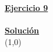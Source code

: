\indent\underline{\textbf{Ejercicio 9}}\\
\lipsum[4]\\

\indent\underline{\textbf{Solución}}\\

\line(1,0){\textwidth}
